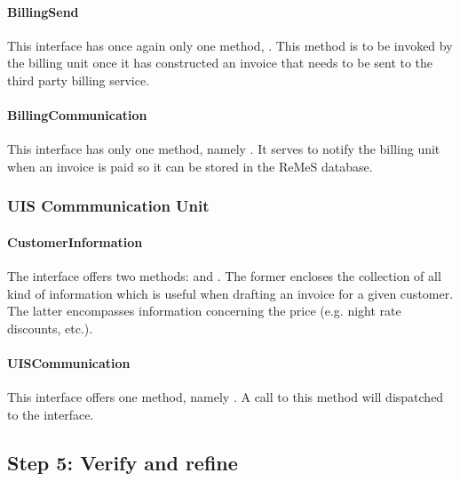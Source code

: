 \paragraph{BillingSend}

\npar This interface has once again only one method, . This method is to be invoked by the billing unit once it has constructed
an invoice that needs to be sent to the third party billing service.

\paragraph{BillingCommunication}

\npar This interface has only one method, namely . It serves to notify the billing unit when an invoice is paid so
it can be stored in the ReMeS database.

\subsubsection{UIS Commmunication Unit}

\paragraph{CustomerInformation}

\npar The  interface offers two methods:
 and
. The former encloses the collection of all
kind of information which is useful when drafting an invoice for a given
customer. The latter encompasses information concerning the price (e.g.
night rate discounts, etc.).

\paragraph{UISCommunication}
\npar This interface offers one method, namely
. A call to this
method will dispatched to the  interface.

\subsection{Step 5: Verify and refine}
\label{add:it9/verification}

